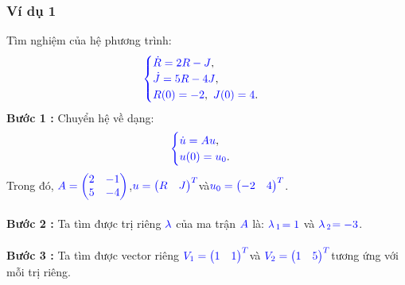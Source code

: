 \documentclass[a4paper]{article}
\begin{document}
\subsubsection{Ví dụ 1}
Tìm nghiệm của hệ phương trình:
\begin{align}
	    \textcolor{blue}{
	    \begin{cases}
            \dot R = 2R - J \textcolor{black}{,}\\
            \dot J = 5R - 4J \textcolor{black}{,}\\
            R(0) = -2\textcolor{black}{,} \enskip J(0) = 4 \textcolor{black}{.}
        \end{cases}
        }
        \notag
	\end{align}
{\bfseries Bước 1 :} Chuyển hệ về dạng:
\begin{align}
	    \textcolor{blue}{
	    \begin{cases}
            \dot u = Au \textcolor{black}{,}\\
            u(0) = u\sb{0}\textcolor{black}{.}
        \end{cases}
        }
        \notag
	\end{align}
Trong đó,  $\textcolor{blue}{A = \begin{pmatrix} 2 & -1\\ 5 & -4 \end{pmatrix}}$,\enskip $\textcolor{blue}{u = \begin{pmatrix} R & J \end{pmatrix}\sp{T}}$\enskip và\enskip $\textcolor{blue}{u\sb{0} = \begin{pmatrix} -2 & 4 \end{pmatrix}\sp{T}}$.\\\\
{\bfseries Bước 2 :} Ta tìm được trị riêng $\textcolor{blue}{\lambda}$ của ma trận $\textcolor{blue}{A}$ là: $\textcolor{blue}{\lambda}$$\textcolor{blue}{\sb{1}}$$\textcolor{blue}{=1}$ và $\textcolor{blue}{\lambda}$$\textcolor{blue}{\sb{2}}$$\textcolor{blue}{=-3}$.\\\\
{\bfseries Bước 3 :} Ta tìm được vector riêng \enskip $\textcolor{blue}{V\sb{1} = \begin{pmatrix} 1 & 1 \end{pmatrix}\sp{T}}$\enskip và \enskip $\textcolor{blue}{V\sb{2} = \begin{pmatrix} 1 & 5 \end{pmatrix}\sp{T}}$\enskip tương ứng với mỗi trị riêng.\\\\
\end{document}
